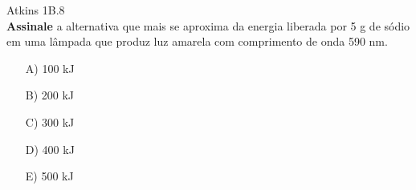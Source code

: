 \begin{problem}[answer = B]

    Atkins 1B.8\\
    \textbf{Assinale} a alternativa que mais se aproxima da energia liberada por 5 g de sódio em uma lâmpada que produz luz amarela com comprimento de onda 590 nm.
    \begin{itemize}
        \item [A)] 100 kJ
        \item [B)] 200 kJ
        \item [C)] 300 kJ
        \item [D)] 400 kJ
        \item [E)] 500 kJ
    \end{itemize}

\end{problem}